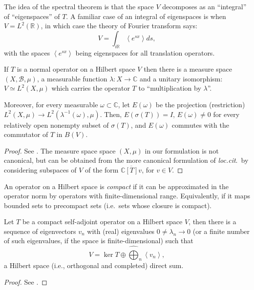 The idea of the spectral theorem is that the space $V$ decomposes as an ``integral'' of ``eigenspaces'' of $T$. A familiar case of an integral of eigenspaces is when $V=L^2(\mathbb R)$, in which case the theory of Fourier transform says:
$$V= \int_{i\mathbb R} \left< e^{sx}\right> ds,$$
with the spaces $\left< e^{sx}\right>$ being eigenspaces for all translation operators. 

\begin{theorem}
\label{theorem-spectraltheorem-normal}
 If $T$ is a normal operator on a Hilbert space $V$ then there is a measure space $(X,\mathcal B,\mu)$, a measurable function $\lambda: X\to \mathbb C$ and a unitary isomorphism: $V \simeq L^2(X,\mu)$ which carries the operator $T$ to ``multiplication by $\lambda$''.
 
 Moreover, for every measurable $\omega\subset \mathbb C$, let $E(\omega)$ be the projection (restriction) $L^2(X,\mu) \to L^2(\lambda^{-1}(\omega),\mu)$. Then, $E(\sigma(T))=I$, $E(\omega)\ne 0$ for every relatively open nonempty subset of $\sigma(T)$, and $E(\omega)$ commutes with the commutator of $T$ in $B(V)$.
\end{theorem}

\begin{proof}
 See \cite[Theorem 12.23]{Rudin}. The measure space space $(X,\mu)$ in our formulation is not canonical, but can be obtained from the more canonical formulation of \emph{loc.cit}.\ by considering subspaces of $V$ of the form $\overline{\mathbb C[T]v}$, for $v\in V$. 
\end{proof}



An operator on a Hilbert space is \emph{compact} if it can be approximated in the operator norm by operators with finite-dimensional range. Equivalently, if it maps bounded sets to precompact sets (i.e.\ sets whose closure is compact). 

\begin{theorem}
\label{theorem-spectraltheorem-compact} 
 Let $T$ be a compact self-adjoint operator on a Hilbert space $V$, then there is a sequence of eigenvectors $v_n$ with (real) eigenvalues $0\ne\lambda_n\to 0$ (or a finite number of such eigenvalues, if the space is finite-dimensional) such that 
 $$V = \ker T \oplus \hat{\bigoplus}_n \left< v_n\right>,$$
a Hilbert space (i.e., orthogonal and completed) direct sum. 
\end{theorem}

\begin{proof}
 See \cite[Theorem 12.30]{Rudin}.
\end{proof}



